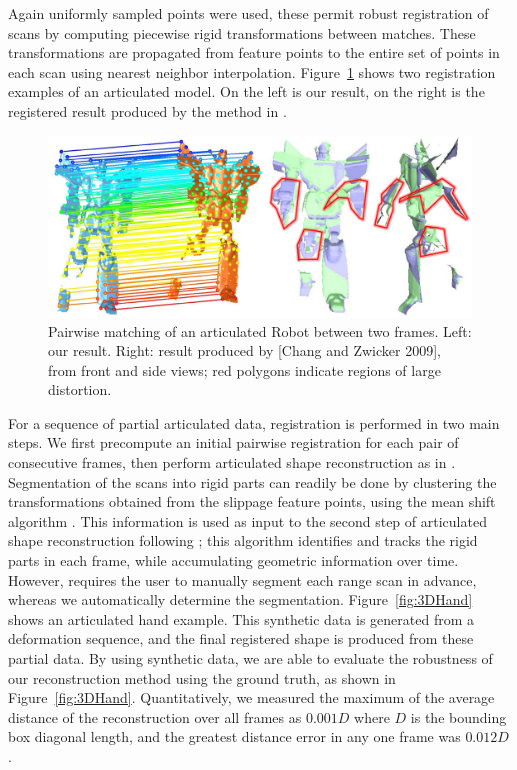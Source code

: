 Again uniformly sampled points were used, these permit robust registration of scans by computing piecewise rigid transformations between matches.
These transformations are propagated from feature points to the entire set of points in each scan using nearest neighbor interpolation.
Figure~\ref{fig:3DRobot} shows two registration examples of an articulated model.
On the left is our result, on the right is the registered result produced by the method in \cite{Chang09}.

\begin{figure}[t!]
\centering
  \includegraphics[width=0.95\linewidth]{figures/Robot.pdf}
  \caption{Pairwise matching of an articulated Robot between two frames.
           Left: our result. Right: result produced by [Chang and Zwicker 2009], from front and side views; red polygons indicate regions of large distortion.}
\label{fig:3DRobot}
\end{figure}

For a sequence of partial articulated data, registration is performed in two main steps.
We first precompute an initial pairwise registration for each pair of consecutive frames, then perform articulated shape reconstruction as in \cite{Pekelny08}.
Segmentation of the scans into rigid parts can readily be done by clustering the transformations obtained from the slippage feature points,
using the mean shift algorithm \cite{Comaniciu02}.
This information is used as input to the second step of articulated shape reconstruction following \cite{Pekelny08};
this algorithm identifies and tracks the rigid parts in each frame, while accumulating  geometric information over time.
However, \cite{Pekelny08} requires the user to manually segment each range scan in advance, whereas we automatically determine  the segmentation.
Figure~\ref{fig:3DHand} shows an articulated hand example.
This synthetic data is generated from a deformation sequence, and the final registered shape is produced from these partial data.
By using synthetic data, we are able to evaluate the robustness of our reconstruction method using the ground truth, as shown in Figure~\ref{fig:3DHand}.
Quantitatively, we measured the maximum of the average distance of the reconstruction over all frames as $0.001 D$ where $D$ is the bounding box diagonal length, and
the greatest distance error in any one frame was $0.012 D$.

